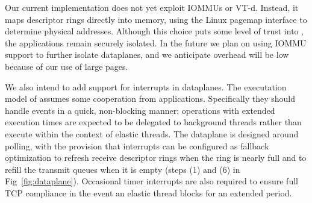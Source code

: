 \begin{comment}
\myparagraph{Using interrupts as a fallback:} Some applications
service requests that require extended intervals of
compute time. We intend for these requests to be delegated
to background threads rather than elastic threads in order
to ensure that elastic threads remain responsive.
However, \ix could also be modified to better tolorate
unanticipated delays during application processing in elastic threads.
One option would be to use interrupts as a fallback mode. On the receive side, we
could program the NIC to fire an interrupt whenever the
recieve descriptor ring is almost full. The dataplane could
then move packets from the receive ring to a structure in software, averting
buffer underrun. On the transmit side, we could program
the NIC to fire an interrupt whenever the transmit ring becomes
empty so that it can be refilled. Such an interrupt would only need
to be armed when there is additional transmit data pending. A desirable
property of this approach is that neither interrupt would
be triggered as long as elastic threads are sufficiently responsive,
but if an elastic thread misbehaves, the \ix dataplane would
be able to regain control and catch up on network processing.
\end{comment}


 Our current
implementation does not yet exploit IOMMUs or VT-d. Instead, it maps
descriptor rings directly into \ix memory, using the Linux
pagemap interface to determine physical addresses.  Although
this choice puts some level of trust into \ix, the applications remain
securely isolated. In the future we plan on using IOMMU support to
further isolate \ix dataplanes, and we anticipate overhead will be
low because of our use of large pages.

We also intend to add support for interrupts in
\ix dataplanes. The executation model of \ix assumes some cooperation from applications.
Specifically they should handle events in a quick, non-blocking manner;
operations with extended execution times are expected to be delegated
to background threads rather than execute within the context of
elastic threads.  The \ix dataplane is designed around polling, with
the provision that interrupts can be configured as fallback
optimization to refresh receive descriptor rings when the ring is
nearly full and to refill the transmit queues when it is empty (steps
(1) and (6) in Fig~\ref{fig:dataplane}). Occasional timer interrupts
are also required to ensure full TCP compliance in the event an elastic
thread blocks for an extended period.

